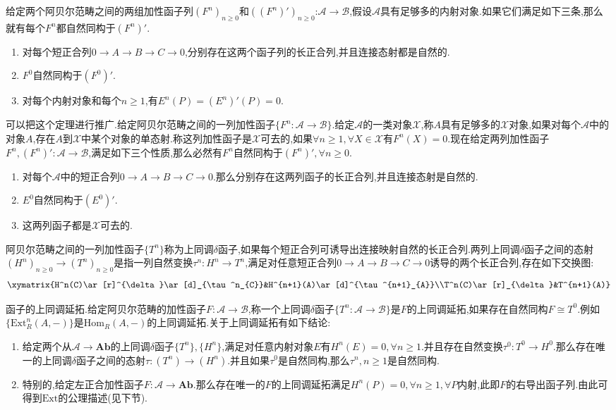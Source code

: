 给定两个阿贝尔范畴之间的两组加性函子列$(F^n)_{n\ge0}$和$((F^n)')_{n\ge0}$:$\mathscr{A}\to\mathscr{B}$,假设$\mathscr{A}$具有足够多的内射对象.如果它们满足如下三条,那么就有每个$F^n$都自然同构于$(F^n)'$.
\begin{enumerate}
	\item 对每个短正合列$0\to A\to B\to C\to0$,分别存在这两个函子列的长正合列,并且连接态射都是自然的.
	\item $F^0$自然同构于$(F^0)'$.
	\item 对每个内射对象和每个$n\ge1$,有$E^n(P)=(E^n)'(P)=0$.
\end{enumerate}

可以把这个定理进行推广.给定阿贝尔范畴之间的一列加性函子$\{F^n:\mathscr{A}\to\mathscr{B}\}$.给定$\mathscr{A}$的一类对象$\mathscr{X}$,称$A$具有足够多的$\mathscr{X}$对象,如果对每个$\mathscr{A}$中的对象$A$,存在$A$到$\mathscr{X}$中某个对象的单态射.称这列加性函子是$\mathscr{X}$可去的,如果$\forall n\ge1,\forall X\in\mathscr{X}$有$F^n(X)=0$.现在给定两列加性函子$F^n,(F^n)':\mathscr{A}\to\mathscr{B}$,满足如下三个性质,那么必然有$F^n$自然同构于$(F^n)',\forall n\ge0$.
\begin{enumerate}
	\item 对每个$\mathscr{A}$中的短正合列$0\to A\to B\to C\to0$.那么分别存在这两列函子的长正合列,并且连接态射是自然的.
	\item $E^0$自然同构于$(E^0)'$.
	\item 这两列函子都是$\mathscr{X}$可去的.
\end{enumerate}

阿贝尔范畴之间的一列加性函子$\{T^n\}$称为上同调$\delta$函子,如果每个短正合列可诱导出连接映射自然的长正合列.两列上同调$\delta$函子之间的态射$(H^n)_{n\ge0}\to(T^n)_{n\ge0}$是指一列自然变换$\tau^n:H^n\to T^n$,满足对任意短正合列$0\to A\to B\to C\to0$诱导的两个长正合列,存在如下交换图:
$$\xymatrix{H^n(C)\ar[r]^{\delta}\ar[d]_{\tau^n_{C}}&H^{n+1}(A)\ar[d]^{\tau^{n+1}_{A}}\\T^n(C)\ar[r]_{\delta}&T^{n+1}(A)}$$

函子的上同调延拓.给定阿贝尔范畴的加性函子$F:\mathscr{A}\to\mathscr{B}$,称一个上同调$\delta$函子$\{T^n:\mathscr{A}\to\mathscr{B}\}$是$F$的上同调延拓,如果存在自然同构$F\cong T^0$.例如$\{\mathrm{Ext}^n_R(A,-)\}$是$\mathrm{Hom}_R(A,-)$的上同调延拓.关于上同调延拓有如下结论:
\begin{enumerate}
	\item 给定两个从$\mathscr{A}\to\textbf{Ab}$的上同调$\delta$函子$\{T^n\},\{H^n\}$,满足对任意内射对象$E$有$H^n(E)=0,\forall n\ge1$.并且存在自然变换$\tau^0:T^0\to H^0$.那么存在唯一的上同调$\delta$函子之间的态射$\tau:(T^n)\to(H^n)$.并且如果$\tau^0$是自然同构,那么$\tau^n,n\ge1$是自然同构.
	\item 特别的,给定左正合加性函子$F:\mathscr{A}\to\textbf{Ab}$.那么存在唯一的$F$的上同调延拓满足$H^n(P)=0,\forall n\ge1,\forall P$内射,此即$F$的右导出函子列.由此可得到$\mathrm{Ext}$的公理描述(见下节).
\end{enumerate}
